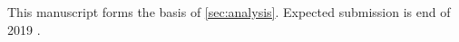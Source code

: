 This manuscript forms the basis of \ref{sec:analysis}. Expected submission is end of 2019 \citep{Denker_elephant_2019}.




